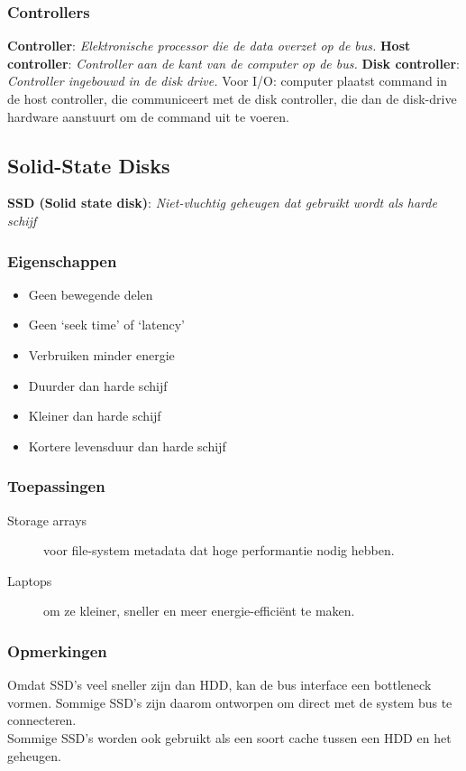 \documentclass[12pt]{article}
\newcommand{\definition}[2]{\textbf{#1}: \textit{#2}}
\begin{document}
\subsubsection{Controllers}
\definition{Controller}{Elektronische processor die de data overzet op de bus.}
\definition{Host controller}{Controller aan de kant van de computer op de bus.}
\definition{Disk controller}{Controller ingebouwd in de disk drive.}
Voor I/O: computer plaatst command in de host controller, die communiceert met de disk controller, die dan de disk-drive hardware aanstuurt om de command uit te voeren.
\subsection{Solid-State Disks}
\definition{SSD (Solid state disk)}{Niet-vluchtig geheugen dat gebruikt wordt als harde schijf}
\subsubsection{Eigenschappen}
\begin{itemize}
	\item Geen bewegende delen
	\item Geen `seek time' of `latency'
	\item Verbruiken minder energie
	\item Duurder dan harde schijf
	\item Kleiner dan harde schijf
	\item Kortere levensduur dan harde schijf
\end{itemize}

\subsubsection{Toepassingen}
\begin{description}
	\item[Storage arrays] voor file-system metadata dat hoge performantie nodig hebben.
	\item[Laptops] om ze kleiner, sneller en meer energie-effici\"{e}nt te maken.
\end{description}

\subsubsection{Opmerkingen}
Omdat SSD's veel sneller zijn dan HDD, kan de bus interface een bottleneck vormen. Sommige SSD's zijn daarom ontworpen om direct met de system bus te connecteren. \\
Sommige SSD's worden ook gebruikt als een soort cache tussen een HDD en het geheugen.
\end{document}
